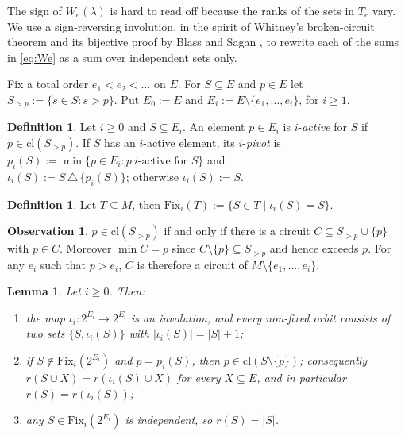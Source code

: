 \documentclass[11pt,a4paper]{article}
\newtheorem{lemma}[theorem]{Lemma}
\theoremstyle{definition}
\newtheorem{definition}[theorem]{Definition}
\newtheorem{observation}[theorem]{Observation}
\newcommand{\Fix}{\mathrm{Fix}}
\newcommand{\cl}{\mathrm{cl}}
\begin{document}
The sign of $W_e(\lambda)$ is hard to read off because the ranks of the sets in $T_e$ vary. We use a sign-reversing involution, in the spirit of Whitney's broken-circuit theorem \cite{whitney32} and its bijective proof by Blass and Sagan \cite{blasssagan}, to rewrite each of the sums in \eqref{eq:We} as a sum over independent sets only.

Fix a total order $e_1<e_2<\dots$ on $E$. For $S\subseteq E$ and $p\in E$ let $S_{>p}:=\{s\in S: s>p\}$. Put $E_0 := E$ and $E_i:=E\setminus\{e_1,\dots,e_i\}$, for $i \ge 1$.

\begin{definition}\label{def:active}
Let $i\ge0$ and $S\subseteq E_i$. An element $p\in E_i$ is $i$-\emph{active} for $S$ if $p\in\cl(S_{>p})$. If $S$ has an $i$-active element, its $i$-\emph{pivot} is $p_i(S):=\min\{p\in E_i: p\ i\text{-active for }S\}$ and \\
$\iota_i(S):=S\,\triangle\,\{p_i(S)\}$; otherwise $\iota_i(S):=S$. 
\end{definition}

\begin{definition}
Let $T \subseteq M$, then $\mathrm{Fix}_i(T) := \{S \in T \mid \iota_i(S) = S\}$.
\end{definition}

\begin{observation}
    $p \in \mathrm{cl}(S_{>p})$ if and only if there is a circuit $C \subseteq S_{>p} \cup \{p\}$ with $p \in C$. Moreover $\min C = p$ since $C \setminus \{p\} \subseteq S_{>p}$ and hence exceeds $p$. For any $e_i$ such that $p > e_i$, $C$ is therefore a circuit of $M \setminus \{e_1, \dots, e_i\}$. 
\end{observation}

\begin{lemma}\label{lem:involution-full}
Let $i\ge0$. Then:
\begin{enumerate}[label=\textnormal{(\alph*)}]
\item the map $\iota_i:2^{E_i}\to2^{E_i}$ is an involution, and every non-fixed
orbit consists of two sets $\{S,\iota_i(S)\}$ with $|\iota_i(S)|=|S|\pm1$;
\item if $S\notin\Fix_i(2^{E_i})$ and $p=p_i(S)$, then $p\in\cl(S\setminus\{p\})$;
consequently $r(S\cup X)=r(\iota_i(S)\cup X)$ for every $X\subseteq E$, and in
particular $r(S)=r(\iota_i(S))$;
\item any $S\in\Fix_i(2^{E_i})$ is independent, so $r(S)=|S|$.
\end{enumerate}
\end{lemma}
\end{document}
